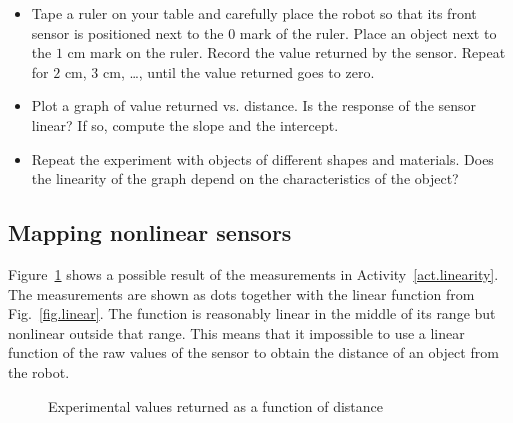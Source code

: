 \begin{framed}
\begin{itemize}
\item Tape a ruler on your table and carefully place the robot so that its
front sensor is positioned next to the $0$ mark of the ruler. Place an object next to the $1$ cm mark on the ruler. Record the value returned by the sensor. Repeat for $2$ cm, $3$ cm, \ldots, until the value returned goes to zero.
\item Plot a graph of value returned vs. distance. Is the response of the sensor linear? If so, compute the slope and the intercept.
\item Repeat the experiment with objects of different shapes and materials. Does the linearity of the graph depend on the characteristics of the object?
\end{itemize}
\end{framed}

\subsection{Mapping nonlinear sensors}

Figure~\ref{fig.nonlinear} shows a possible result of the measurements in Activity~\ref{act.linearity}. The measurements are shown as dots together with the linear function from Fig.~\ref{fig.linear}. The function is reasonably linear in the middle of its range but nonlinear outside that range. This means that it impossible to use a linear function of the raw values of the sensor to obtain the distance of an object from the robot.

\begin{figure}
\begin{center}
\caption{Experimental values returned as a function of distance}\label{fig.nonlinear}
\end{center}
\end{figure}

